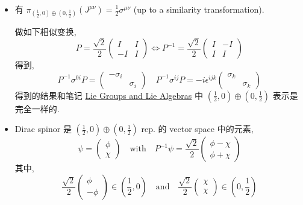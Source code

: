 \begin{itemize}
	\noindent\rule[0.5ex]{\linewidth}{0.5pt} %
	
	\item 有 $\pi_{(\frac{1}{2}, 0) \oplus (0, \frac{1}{2})}(J^{\mu \nu}) = \frac{1}{2} \sigma^{\mu \nu}$ (up to a similarity transformation).
	
	\begin{tcolorbox}[title=calculation:]
		做如下相似变换,
		\begin{equation}
			P = \frac{\sqrt{2}}{2} \begin{pmatrix}
				I & I \\
				- I & I
			\end{pmatrix} \iff P^{- 1} = \frac{\sqrt{2}}{2} \begin{pmatrix}
				I & - I \\
				I & I
			\end{pmatrix}
		\end{equation}
		得到,
		\begin{equation}
			P^{- 1} \sigma^{0 i} P = \begin{pmatrix}
				- \sigma_i & \\
				& \sigma_i
			\end{pmatrix} \quad P^{- 1} \sigma^{i j} P = - i \epsilon^{i j k} \begin{pmatrix}
				\sigma_k & \\
				& \sigma_k
			\end{pmatrix}
		\end{equation}
		得到的结果和笔记 \href{https://github.com/siyang03/my-note---Lie-Groups-and-Lie-Algebras}{Lie Groups and Lie Algebras} 中 $(\frac{1}{2}, 0) \oplus (0, \frac{1}{2})$ 表示是完全一样的.
	\end{tcolorbox}
	
	\item Dirac spinor 是 $(\frac{1}{2}, 0) \oplus (0, \frac{1}{2})$ rep. 的 vector space 中的元素,
	\begin{equation}
		\psi = \begin{pmatrix}
			\phi \\
			\chi
		\end{pmatrix} \quad \text{with} \quad P^{- 1} \psi = \frac{\sqrt{2}}{2} \begin{pmatrix}
			\phi - \chi \\
			\phi + \chi
		\end{pmatrix}
	\end{equation}
	其中,
	\begin{equation}
		\frac{\sqrt{2}}{2} \begin{pmatrix}
			\phi \\
			- \phi
		\end{pmatrix} \in (\frac{1}{2}, 0) \quad \text{and} \quad \frac{\sqrt{2}}{2} \begin{pmatrix}
			\chi \\
			\chi
		\end{pmatrix} \in (0, \frac{1}{2})
	\end{equation}
	

\end{itemize}

